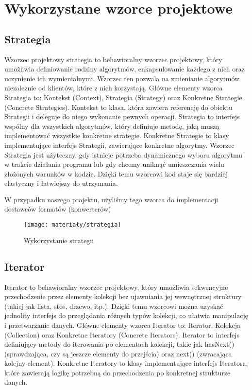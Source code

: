 \section{Wykorzystane wzorce projektowe}
\subsection{Strategia}
Wzorzec projektowy strategia to behawioralny wzorzec projektowy, który umożliwia definiowanie rodziny algorytmów, enkapsulowanie każdego z nich oraz uczynienie ich wymienialnymi. Wzorzec ten pozwala na zmienianie algorytmów niezależnie od klientów, które z nich korzystają. Główne elementy wzorca Strategia to: Kontekst (Context), Strategia (Strategy) oraz Konkretne Strategie (Concrete Strategies). Kontekst to klasa, która zawiera referencję do obiektu Strategii i deleguje do niego wykonanie pewnych operacji. Strategia to interfejs wspólny dla wszystkich algorytmów, który definiuje metodę, jaką muszą implementować wszystkie konkretne strategie. Konkretne Strategie to klasy implementujące interfejs Strategii, zawierające konkretne algorytmy. Wzorzec Strategia jest użyteczny, gdy istnieje potrzeba dynamicznego wyboru algorytmu w trakcie działania programu lub gdy chcemy uniknąć umieszczania wielu złożonych warunków w kodzie. Dzięki temu wzorcowi kod staje się bardziej elastyczny i łatwiejszy do utrzymania.

W przypadku naszego projektu, użyliśmy tego wzorca do implementacji dostawców formatów (konwerterów)
\begin{figure}[ht]
	\centering
	\texttt{[image: materiały/strategia]}
	\caption{Wykorzystanie strategii}
\end{figure}

\subsection{Iterator}
Iterator to behawioralny wzorzec projektowy, który umożliwia sekwencyjne przechodzenie przez elementy kolekcji bez ujawniania jej wewnętrznej struktury (takiej jak lista, stos, drzewo, itp.). Dzięki temu wzorcowi można uzyskać jednolity interfejs do przeglądania różnych typów kolekcji, co ułatwia manipulację i przetwarzanie danych. Główne elementy wzorca Iterator to: Iterator, Kolekcja (Collection) oraz Konkretne Iteratory (Concrete Iterators). Iterator to interfejs definiujący metody do iterowania po elementach kolekcji, takie jak hasNext() (sprawdzająca, czy są jeszcze elementy do przejścia) oraz next() (zwracająca kolejny element). Konkretne Iteratory to klasy implementujące interfejs Iteratora, które zawierają logikę potrzebną do przechodzenia po konkretnej strukturze danych.

